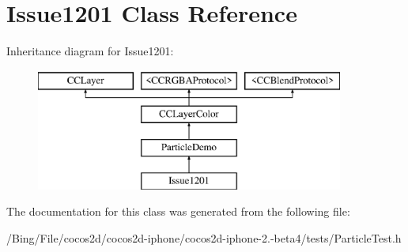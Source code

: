 \hypertarget{interface_issue1201}{\section{Issue1201 Class Reference}
\label{interface_issue1201}
}
Inheritance diagram for Issue1201\-:\begin{figure}[H]
\begin{center}
\leavevmode
\includegraphics[height=4.000000cm]{interface_issue1201}
\end{center}
\end{figure}


The documentation for this class was generated from the following file\-:\begin{DoxyCompactItemize}
\item 
/\-Bing/\-File/cocos2d/cocos2d-\/iphone/cocos2d-\/iphone-\/2.-\/beta4/tests/Particle\-Test.\-h\end{DoxyCompactItemize}
